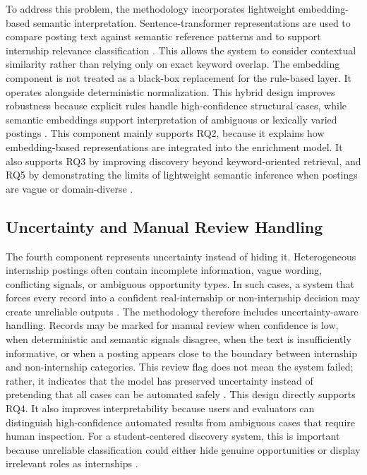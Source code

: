 To address this problem, the methodology incorporates lightweight embedding-based semantic interpretation.
Sentence-transformer representations are used to compare posting text against semantic reference patterns and to
support internship relevance classification \cite{reimers2019sentence, senger2024deep}. This allows the system to consider contextual similarity rather than
relying only on exact keyword overlap.
The embedding component is not treated as a black-box replacement for the rule-based layer. It operates
alongside deterministic normalization. This hybrid design improves robustness because explicit rules handle
high-confidence structural cases, while semantic embeddings support interpretation of ambiguous or lexically
varied postings \cite{luan2021sparse, sarawagi2008information}.
This component mainly supports RQ2, because it explains how embedding-based representations are integrated
into the enrichment model. It also supports RQ3 by improving discovery beyond keyword-oriented retrieval, and
RQ5 by demonstrating the limits of lightweight semantic inference when postings are vague or domain-diverse \cite{menghani2023efficient}.


\subsection{Uncertainty and Manual Review Handling}


The fourth component represents uncertainty instead of hiding it. Heterogeneous internship postings often
contain incomplete information, vague wording, conflicting signals, or ambiguous opportunity types. In such
cases, a system that forces every record into a confident real-internship or non-internship decision may create
unreliable outputs \cite{hunkenschroer2022ethics, rigotti2024fairness}.
The methodology therefore includes uncertainty-aware handling. Records may be marked for manual review
when confidence is low, when deterministic and semantic signals disagree, when the text is insufficiently
informative, or when a posting appears close to the boundary between internship and non-internship categories.
This review flag does not mean the system failed; rather, it indicates that the model has preserved uncertainty
instead of pretending that all cases can be automated safely \cite{krippendorff2004content}.
This design directly supports RQ4. It also improves interpretability because users and evaluators can distinguish
high-confidence automated results from ambiguous cases that require human inspection. For a student-centered
discovery system, this is important because unreliable classification could either hide genuine opportunities or
display irrelevant roles as internships \cite{raghavan2020mitigating}.


